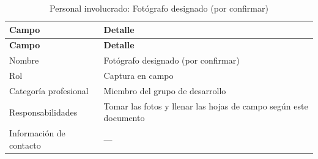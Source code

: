 \documentclass[11pt]{article}
\begin{document}
{\small
\begin{longtable}{|>{\RaggedRight\arraybackslash}p{3.91cm}|>{\RaggedRight\arraybackslash}p{10.95cm}|}
\caption{Personal involucrado: Fotógrafo designado (por confirmar)}\\
\hline
\rowcolor{encabezado}\textbf{Campo} & \textbf{Detalle} \\ \hline
\endfirsthead
\hline
\rowcolor{encabezado}\textbf{Campo} & \textbf{Detalle} \\ \hline
\endhead
Nombre & Fotógrafo designado (por confirmar) \\ \hline
Rol & Captura en campo \\ \hline
Categoría profesional & Miembro del grupo de desarrollo \\ \hline
Responsabilidades & Tomar las fotos y llenar las hojas de campo según este documento \\ \hline
Información de contacto & — \\ \hline
\end{longtable}}
\end{document}
